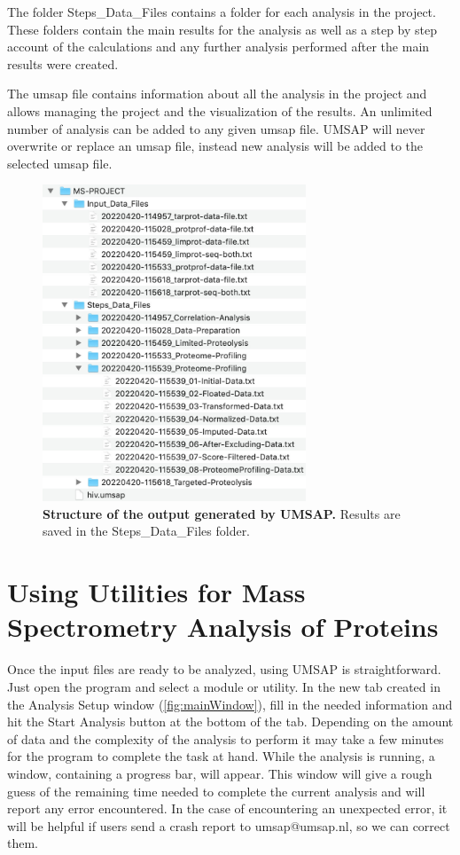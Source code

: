The folder Steps{\_}Data{\_}Files contains a folder for each analysis in the project.
These folders contain the main results for the analysis as well as a step by step
account of the calculations and any further analysis performed after the main results
were created.

The umsap file contains information about all the analysis in the project and allows
managing the project and the visualization of the results. An unlimited number of
analysis can be added to any given umsap file. UMSAP will never overwrite or replace
an umsap file, instead new analysis will be added to the selected umsap file.

\begin{figure}[h]
    \centering
    \includegraphics[width=0.7\textwidth]{./IMAGES/OUTPUT/folder.jpg}
    \caption[Structure of the output generated by UMSAP]{\textbf{Structure of the
output generated by UMSAP.} Results are saved in the Steps{\_}Data{\_}Files folder.}
    \label{fig:outFolder}
    \vspace{-5pt}
\end{figure}

\section{Using Utilities for Mass Spectrometry Analysis of Proteins}

Once the input files are ready to be analyzed, using UMSAP is straightforward. Just
open the program and select a module or utility. In the new tab created in the Analysis
Setup window (\autoref{fig:mainWindow}), fill in the needed
information and hit the Start Analysis button at the bottom of the tab. Depending on
the amount of data and the complexity of the analysis to perform it may take a few
minutes for the program to complete the task at hand. While the analysis is running, a
window, containing a progress bar, will appear. This window will give a rough guess
of the remaining time needed to complete the current analysis and will report any error
encountered. In the case of encountering an unexpected error, it will be helpful if
users send a crash report to umsap@umsap.nl, so we can correct them.

